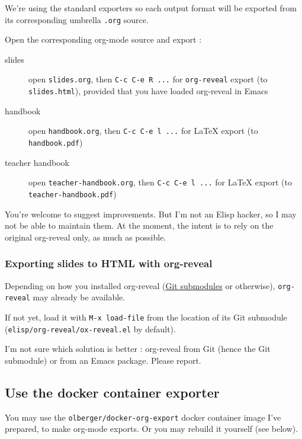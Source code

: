 \documentclass[a4paper]{article}
\begin{document}
We're using the standard exporters so each output format will be exported from its corresponding umbrella \texttt{.org} source.

Open the corresponding org-mode source and export :

\begin{description}
\item[{slides}] open \texttt{slides.org}, then \texttt{C-c C-e R ...} for \texttt{org-reveal} export (to \texttt{slides.html}), provided that you have loaded org-reveal in Emacs
\item[{handbook}] open \texttt{handbook.org}, then \texttt{C-c C-e l ...} for \LaTeX{} export (to \texttt{handbook.pdf})
\item[{teacher handbook}] open \texttt{teacher-handbook.org}, then \texttt{C-c C-e l ...} for \LaTeX{} export (to \texttt{teacher-handbook.pdf})
\end{description}

\begin{NOTES}
You're welcome to suggest improvements. But I'm not an Elisp hacker,
so I may not be able to maintain them. At the moment, the intent is to
rely on the original org-reveal only, as much as possible.
\end{NOTES}

\subsubsection{Exporting slides to HTML with org-reveal}
\label{sec:orgde7898e}

Depending on how you installed org-reveal (\hyperref[sec:orge2a24e1]{Git submodules} or otherwise), \texttt{org-reveal} may already be available.

If not yet, load it with \texttt{M-x load-file} from the location of its Git submodule (\texttt{elisp/org-reveal/ox-reveal.el} by default).

\begin{NOTES}
I'm not sure which solution is better : org-reveal from Git (hence the Git submodule) or from an Emacs package. Please report.
\end{NOTES}

\subsection{Use the docker container exporter}
\label{sec:org7ef6798}

You may use the \texttt{olberger/docker-org-export} docker container image
I've prepared, to make org-mode exports. Or you may rebuild it
yourself (see below).
\end{document}
